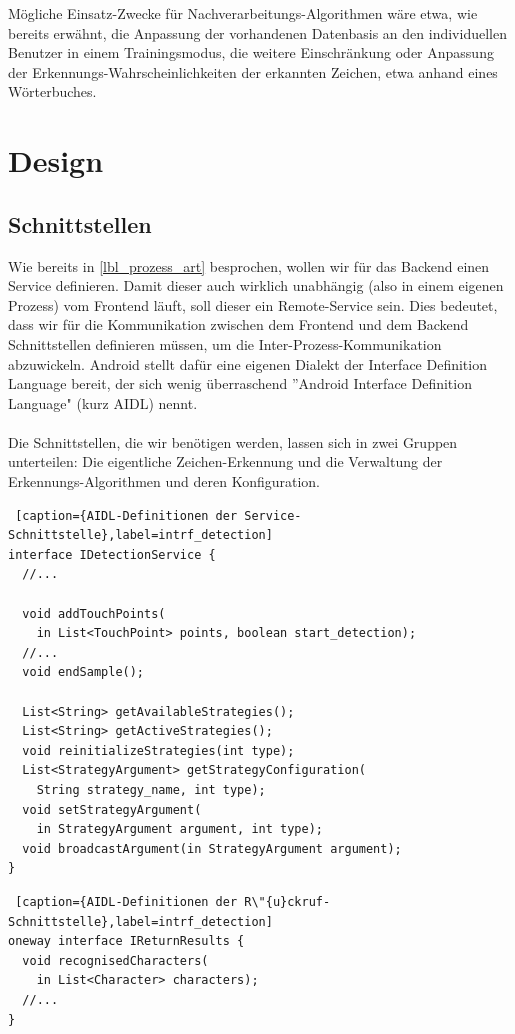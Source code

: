 Mögliche Einsatz-Zwecke für Nachverarbeitungs-Algorithmen wäre etwa, wie bereits erwähnt, die Anpassung der vorhandenen Datenbasis an den individuellen Benutzer in einem Trainingsmodus, die weitere Einschränkung oder Anpassung der Erkennungs-Wahrscheinlichkeiten der erkannten Zeichen, etwa anhand eines Wörterbuches.

\section{Design}

\subsection{Schnittstellen}\label{lbl_be_intrf}

Wie bereits in \ref{lbl_prozess_art} besprochen, wollen wir für das Backend einen Service definieren. Damit dieser auch wirklich unabhängig (also in einem eigenen Prozess) vom Frontend läuft, soll dieser ein Remote-Service sein. Dies bedeutet, dass wir für die Kommunikation zwischen dem Frontend und dem Backend Schnittstellen definieren müssen, um die Inter-Prozess-Kommunikation abzuwickeln. Android stellt dafür eine eigenen Dialekt der Interface Definition Language bereit, der sich wenig überraschend ''Android Interface Definition Language" (kurz AIDL) nennt.\\
\\
Die Schnittstellen, die wir benötigen werden, lassen sich in zwei Gruppen unterteilen: Die eigentliche Zeichen-Erkennung und die Verwaltung der Erkennungs-Algorithmen und deren Konfiguration.\\

\begin{lstlisting} [caption={AIDL-Definitionen der Service-Schnittstelle},label=intrf_detection]
interface IDetectionService {
  //...

  void addTouchPoints(
    in List<TouchPoint> points, boolean start_detection);
  //...
  void endSample();

  List<String> getAvailableStrategies();
  List<String> getActiveStrategies();
  void reinitializeStrategies(int type);
  List<StrategyArgument> getStrategyConfiguration(
    String strategy_name, int type);
  void setStrategyArgument(
    in StrategyArgument argument, int type);
  void broadcastArgument(in StrategyArgument argument);
}
\end{lstlisting}
\newpage
\begin{lstlisting} [caption={AIDL-Definitionen der R\"{u}ckruf-Schnittstelle},label=intrf_detection]
oneway interface IReturnResults {
  void recognisedCharacters(
    in List<Character> characters);
  //...
}
\end{lstlisting}

